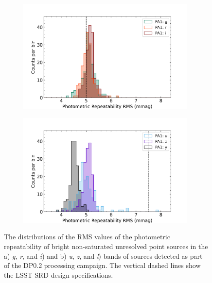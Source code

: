 \begin{figure}[ht]
\begin{subfigure}{.5\textwidth}
    \centering
    \includegraphics[width=0.98\textwidth]{figures/dp02_pa1_alltracts_gri}
\end{subfigure}
\begin{subfigure}{.5\textwidth}
    \centering
    \includegraphics[width=0.98\textwidth]{figures/dp02_pa1_alltracts_uzy}
\end{subfigure}
\par\medskip
\caption[short]{\label{fig:faro_dp02_distr_pa1}
The distributions of the RMS values of the photometric repeatability of bright non-saturated unresolved point sources  in the a) \emph{g}, \emph{r}, and \emph{i})  and  b) \emph{u}, \emph{z}, and \emph{l}) bands of sources detected as part of the DP0.2 processing campaign.  
The vertical dashed lines show the LSST SRD design specifications. }
\end{figure}

